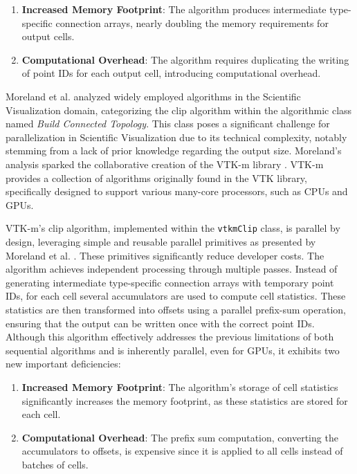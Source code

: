 \documentclass{egpubl}
\begin{document}
\begin{enumerate}
    \item \textbf{Increased Memory Footprint}: The algorithm produces intermediate type-specific connection arrays, nearly doubling the memory requirements for output cells.
    \item \textbf{Computational Overhead}: The algorithm requires duplicating the writing of point IDs for each output cell, introducing computational overhead.
\end{enumerate}

Moreland et al. \cite{ClassSciViz} analyzed widely employed algorithms in the Scientific Visualization domain, categorizing the clip algorithm within the algorithmic class named \textit{Build Connected Topology}. This class poses a significant challenge for parallelization in Scientific Visualization due to its technical complexity, notably stemming from a lack of prior knowledge regarding the output size. Moreland's analysis sparked the collaborative creation of the VTK-m library \cite{VTKm}. VTK-m provides a collection of algorithms originally found in the VTK library, specifically designed to support various many-core processors, such as CPUs and GPUs.

VTK-m's clip algorithm, implemented within the \texttt{vtkmClip} class, is parallel by design, leveraging simple and reusable parallel primitives as presented by Moreland et al. \cite{MCD3}. These primitives significantly reduce developer costs. The algorithm achieves independent processing through multiple passes. Instead of generating intermediate type-specific connection arrays with temporary point IDs, for each cell several accumulators are used to compute cell statistics. These statistics are then transformed into offsets using a parallel prefix-sum operation, ensuring that the output can be written once with the correct point IDs. Although this algorithm effectively addresses the previous limitations of both sequential algorithms and is inherently parallel, even for GPUs, it exhibits two new important deficiencies:

\begin{enumerate}
    \item \textbf{Increased Memory Footprint}: The algorithm's storage of cell statistics significantly increases the memory footprint, as these statistics are stored for each cell.
    \item \textbf{Computational Overhead}: The prefix sum computation, converting the accumulators to offsets, is expensive since it is applied to all cells instead of batches of cells. 
\end{enumerate}
\end{document}
